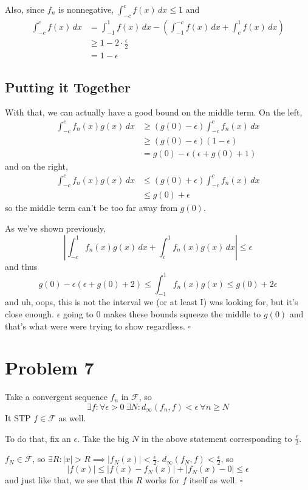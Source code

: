 \documentclass[12pt]{article}
\begin{document}
Also, since $f_n$ is nonnegative, $\int_{-c}^{c} f(x)\,dx \le 1$ and
\begin{align*}
  \int_{-c}^{c} f(x)\,dx
   & = \int_{-1}^{1} f(x)\,dx - \left(\int_{-1}^{-c} f(x)\,dx + \int_{c}^{1} f(x)\,dx\right) \\
   & \ge 1 - 2 \cdot \frac{\epsilon}{2}                                                      \\
   & = 1-\epsilon
\end{align*}

\pagebreak

\subsection{Putting it Together}

With that, we can actually have a good bound on the middle term.
On the left,
\begin{align*}
  \int_{-c}^{c} f_n(x)g(x)\,dx
   & \ge (g(0)-\epsilon)\int_{-c}^{c} f_n(x)\,dx \\
   & \ge (g(0)-\epsilon)(1-\epsilon)             \\
   & = g(0) - \epsilon(\epsilon+g(0)+1)
\end{align*}
and on the right,
\begin{align*}
  \int_{-c}^{c} f_n(x)g(x)\,dx
   & \le (g(0)+\epsilon)\int_{-c}^{c} f_n(x)\,dx \\
   & \le g(0)+\epsilon
\end{align*}
so the middle term can't be too far away from $g(0)$.

As we've shown previously,
\[\left|\int_{-c}^{1} f_n(x)g(x)\,dx + \int_{c}^{1} f_n(x)g(x)\,dx \right|\le \epsilon\]
and thus
\[g(0)-\epsilon(\epsilon+g(0)+2) \le \int_{-1}^{1} f_n(x)g(x) \le g(0)+2\epsilon\]
and uh, oops, this is not the interval we (or at least I) was looking for,
but it's close enough.
$\epsilon$ going to $0$ makes these bounds squeeze the middle to $g(0)$
and that's what were were trying to show regardless. $\square$

\pagebreak

\section{Problem 7}

Take a convergent sequence $f_n$ in $\mathcal{F}$, so
\[\exists f: \forall \epsilon > 0\ \exists N: d_\infty(f_n, f) < \epsilon\ \forall n \ge N\]
It STP $f \in \mathcal{F}$ as well.

To do that, fix an $\epsilon$.
Take the big $N$ in the above statement corresponding to $\frac{\epsilon}{2}$.

$f_N \in \mathcal{F}$, so $\exists R: |x| > R \implies |f_N(x)| < \frac{\epsilon}{2}$.
$d_\infty(f_N, f) < \frac{\epsilon}{2}$, so
\[|f(x)| \le |f(x)-f_N(x)|+|f_N(x)-0| \le \epsilon\]
and just like that, we see that this $R$ works for $f$ itself as well. $\square$
\end{document}
